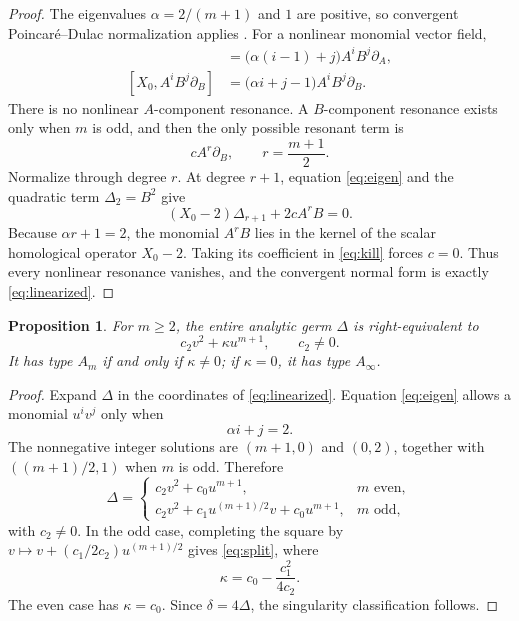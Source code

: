 \documentclass[11pt]{article}
\newtheorem{proposition}[theorem]{Proposition}
\theoremstyle{remark}
\begin{document}
\begin{proof}
The eigenvalues $\alpha=2/(m+1)$ and $1$ are positive, so convergent
Poincar\'{e}--Dulac normalization applies \cite{Arnold}.  For a nonlinear
monomial vector field,
\begin{align*}
 [X_0,A^iB^j\partial_A]
 &=\bigl(\alpha(i-1)+j\bigr)A^iB^j\partial_A,\\
 [X_0,A^iB^j\partial_B]
 &=\bigl(\alpha i+j-1\bigr)A^iB^j\partial_B.
\end{align*}
There is no nonlinear $A$-component resonance.  A $B$-component resonance
exists only when $m$ is odd, and then the only possible resonant term is
\[
 cA^r\partial_B,
 \qquad r=\frac{m+1}{2}.
\]
Normalize through degree $r$.  At degree $r+1$, equation
\eqref{eq:eigen} and the quadratic term $\Delta_2=B^2$ give
\begin{equation}\label{eq:kill}
 (X_0-2)\Delta_{r+1}+2cA^rB=0.
\end{equation}
Because $\alpha r+1=2$, the monomial $A^rB$ lies in the kernel of the
scalar homological operator $X_0-2$.  Taking its coefficient in
\eqref{eq:kill} forces $c=0$.  Thus every nonlinear resonance vanishes,
and the convergent normal form is exactly \eqref{eq:linearized}.
\end{proof}

\begin{proposition}\label{prop:classification}
For $m\ge2$, the entire analytic germ $\Delta$ is right-equivalent to
\begin{equation}\label{eq:split}
 c_2v^2+\kappa u^{m+1},
 \qquad c_2\ne0.
\end{equation}
It has type $A_m$ if and only if $\kappa\ne0$; if $\kappa=0$, it has type
$A_\infty$.
\end{proposition}

\begin{proof}
Expand $\Delta$ in the coordinates of \eqref{eq:linearized}.  Equation
\eqref{eq:eigen} allows a monomial $u^iv^j$ only when
\begin{equation}\label{eq:weight}
 \alpha i+j=2.
\end{equation}
The nonnegative integer solutions are $(m+1,0)$ and $(0,2)$, together with
$((m+1)/2,1)$ when $m$ is odd.  Therefore
\[
 \Delta=
 \begin{cases}
  c_2v^2+c_0u^{m+1},&m\text{ even},\\[1mm]
  c_2v^2+c_1u^{(m+1)/2}v+c_0u^{m+1},&m\text{ odd},
 \end{cases}
\]
with $c_2\ne0$.  In the odd case, completing the square by
$v\mapsto v+(c_1/2c_2)u^{(m+1)/2}$ gives \eqref{eq:split}, where
\[
 \kappa=c_0-\frac{c_1^2}{4c_2}.
\]
The even case has $\kappa=c_0$.  Since $\delta=4\Delta$, the singularity
classification follows.
\end{proof}
\end{document}
